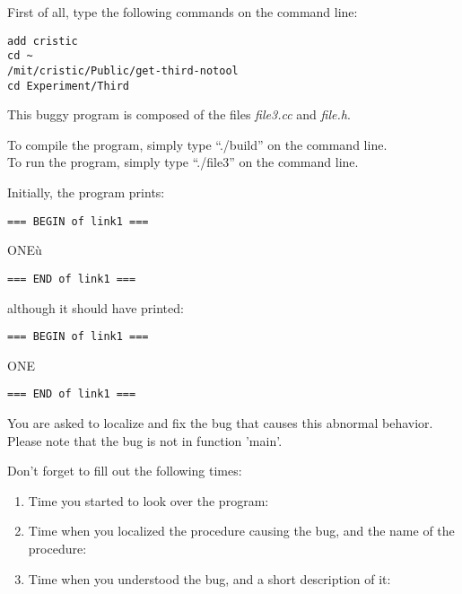 \documentclass{article}
\title{}
\author{Bug 3 - No Tool}
\date{July 30, 2003}
\begin{document}
\maketitle
\begin{flushleft}
\vspace{0.5in}

\thispagestyle{empty}

First of all, type the following commands on the command line:
\begin{verbatim}
add cristic
cd ~
/mit/cristic/Public/get-third-notool
cd Experiment/Third
\end{verbatim}


\vspace{0.1in}
This buggy program is composed of the files {\it file3.cc} and 
{\it file.h}. 

\vspace{0.1in}
To compile the program, simply type ``./build'' on the command line.\\
To run the program, simply type ``./file3'' on the command line.


\vspace{0.1in}
Initially, the program prints:


\begin{verbatim}
=== BEGIN of link1 ===
\end{verbatim}
\vspace{-0.08in}
ONE\`{u}
\vspace{-0.08in}
\begin{verbatim}
=== END of link1 ===
\end{verbatim}

although it should have printed:
\begin{verbatim}
=== BEGIN of link1 ===
\end{verbatim}
\vspace{-0.08in}
ONE
\vspace{-0.08in}
\begin{verbatim}
=== END of link1 ===
\end{verbatim}

You are asked to localize and fix the bug that causes this abnormal behavior.
Please note that the bug is not in function 'main'.


\vspace{0.3in}
Don't forget to fill out the following times:
\begin{enumerate}
\item{Time you started to look over the program:}
\item{Time when you localized the procedure causing the bug, and the name
      of the procedure:\vspace{0.2in}}
\item{Time when you understood the bug, and a short description of it:\vspace{0.4in}}


\end{enumerate}
\end{flushleft}
\end{document}
